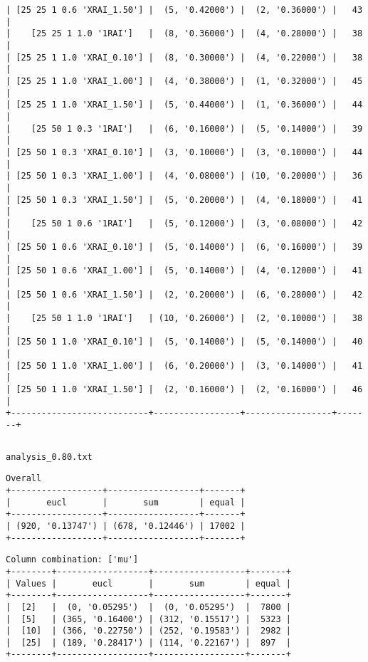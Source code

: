 \documentclass{article}
\begin{document}
\begin{verbatim}
| [25 25 1 0.6 'XRAI_1.50'] |  (5, '0.42000') |  (2, '0.36000') |   43  |
|    [25 25 1 1.0 '1RAI']   |  (8, '0.36000') |  (4, '0.28000') |   38  |
| [25 25 1 1.0 'XRAI_0.10'] |  (8, '0.30000') |  (4, '0.22000') |   38  |
| [25 25 1 1.0 'XRAI_1.00'] |  (4, '0.38000') |  (1, '0.32000') |   45  |
| [25 25 1 1.0 'XRAI_1.50'] |  (5, '0.44000') |  (1, '0.36000') |   44  |
|    [25 50 1 0.3 '1RAI']   |  (6, '0.16000') |  (5, '0.14000') |   39  |
| [25 50 1 0.3 'XRAI_0.10'] |  (3, '0.10000') |  (3, '0.10000') |   44  |
| [25 50 1 0.3 'XRAI_1.00'] |  (4, '0.08000') | (10, '0.20000') |   36  |
| [25 50 1 0.3 'XRAI_1.50'] |  (5, '0.20000') |  (4, '0.18000') |   41  |
|    [25 50 1 0.6 '1RAI']   |  (5, '0.12000') |  (3, '0.08000') |   42  |
| [25 50 1 0.6 'XRAI_0.10'] |  (5, '0.14000') |  (6, '0.16000') |   39  |
| [25 50 1 0.6 'XRAI_1.00'] |  (5, '0.14000') |  (4, '0.12000') |   41  |
| [25 50 1 0.6 'XRAI_1.50'] |  (2, '0.20000') |  (6, '0.28000') |   42  |
|    [25 50 1 1.0 '1RAI']   | (10, '0.26000') |  (2, '0.10000') |   38  |
| [25 50 1 1.0 'XRAI_0.10'] |  (5, '0.14000') |  (5, '0.14000') |   40  |
| [25 50 1 1.0 'XRAI_1.00'] |  (6, '0.20000') |  (3, '0.14000') |   41  |
| [25 50 1 1.0 'XRAI_1.50'] |  (2, '0.16000') |  (2, '0.16000') |   46  |
+---------------------------+-----------------+-----------------+-------+
\end{verbatim}

\begin{verbatim}

\end{verbatim}

\newpage
\verb|analysis_0.80.txt|
\begin{verbatim}
Overall
+------------------+------------------+-------+
|       eucl       |       sum        | equal |
+------------------+------------------+-------+
| (920, '0.13747') | (678, '0.12446') | 17002 |
+------------------+------------------+-------+
\end{verbatim}

\begin{verbatim}
Column combination: ['mu']
+--------+------------------+------------------+-------+
| Values |       eucl       |       sum        | equal |
+--------+------------------+------------------+-------+
|  [2]   |  (0, '0.05295')  |  (0, '0.05295')  |  7800 |
|  [5]   | (365, '0.16400') | (312, '0.15517') |  5323 |
|  [10]  | (366, '0.22750') | (252, '0.19583') |  2982 |
|  [25]  | (189, '0.28417') | (114, '0.22167') |  897  |
+--------+------------------+------------------+-------+
\end{verbatim}
\end{document}
